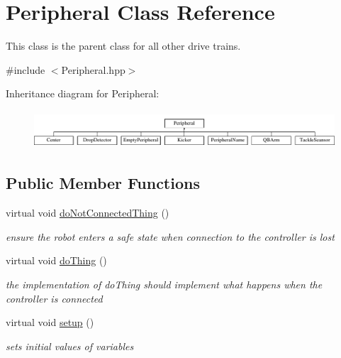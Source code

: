 \hypertarget{class_peripheral}{}\section{Peripheral Class Reference}
\label{class_peripheral}


This class is the parent class for all other drive trains.  




{\ttfamily \#include $<$Peripheral.\+hpp$>$}

Inheritance diagram for Peripheral\+:\begin{figure}[H]
\begin{center}
\leavevmode
\includegraphics[height=1.415929cm]{class_peripheral}
\end{center}
\end{figure}
\subsection*{Public Member Functions}
\begin{DoxyCompactItemize}
\item 
\mbox{\label{class_peripheral_a331e23603fba1cebb2d4745d46ed2bfe}} 
virtual void \mbox{\hyperlink{class_peripheral_a331e23603fba1cebb2d4745d46ed2bfe}{do\+Not\+Connected\+Thing}} ()
\begin{DoxyCompactList}\small\item\em ensure the robot enters a safe state when connection to the controller is lost \end{DoxyCompactList}\item 
\mbox{\label{class_peripheral_a8643ea34b0c89019aeff10b0d2667e46}} 
virtual void \mbox{\hyperlink{class_peripheral_a8643ea34b0c89019aeff10b0d2667e46}{do\+Thing}} ()
\begin{DoxyCompactList}\small\item\em the implementation of do\+Thing should implement what happens when the controller is connected \end{DoxyCompactList}\item 
\mbox{\label{class_peripheral_a2ad7fea98c49d0d319bfa17ca4dcff6c}} 
virtual void \mbox{\hyperlink{class_peripheral_a2ad7fea98c49d0d319bfa17ca4dcff6c}{setup}} ()
\begin{DoxyCompactList}\small\item\em sets initial values of variables \end{DoxyCompactList}\end{DoxyCompactItemize}


